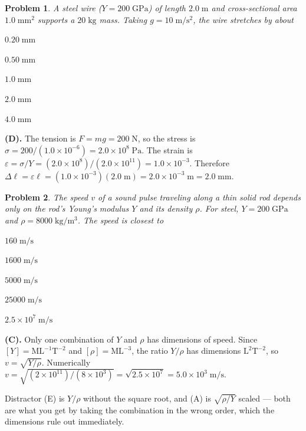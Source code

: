 \documentclass[11pt]{article}
\newcommand{\clearpts}{\addtocounter{tpts}{\value{cpts}} \setcounter{cpts}{0}}
\newcommand{\pts}[1]{\clearpts \setcounter{cpts}{#1}}
\theoremstyle{mystyle}
\newtheorem{pproblem}{Problem}
\begin{document}
\pts{4}
\begin{pproblem}
A steel wire ($Y = 200\;\mathrm{GPa}$) of length $2.0\;\mathrm{m}$ and cross-sectional
area $1.0\;\mathrm{mm}^2$ supports a $20\;\mathrm{kg}$ mass. Taking
$g = 10\;\mathrm{m/s^2}$, the wire stretches by about
\begin{mcchoices}
\item $0.20\;\mathrm{mm}$
\item $0.50\;\mathrm{mm}$
\item $1.0\;\mathrm{mm}$
\item $2.0\;\mathrm{mm}$
\item $4.0\;\mathrm{mm}$
\end{mcchoices}
\end{pproblem}
\begin{solution}
\textbf{(D).} The tension is $F = mg = 200\;\mathrm{N}$, so the stress is
$\sigma = 200/(1.0\times10^{-6}) = 2.0\times 10^{8}\;\mathrm{Pa}$. The strain is
$\varepsilon = \sigma/Y = (2.0\times10^{8})/(2.0\times10^{11}) = 1.0\times 10^{-3}$.
Therefore $\Delta \ell = \varepsilon \ell = (1.0\times10^{-3})(2.0\;\mathrm{m})
= 2.0\times 10^{-3}\;\mathrm{m} = 2.0\;\mathrm{mm}$.
\end{solution}

\pts{4}
\begin{pproblem}
The speed $v$ of a sound pulse traveling along a thin solid rod depends only on the rod's
Young's modulus $Y$ and its density $\rho$. For steel, $Y = 200\;\mathrm{GPa}$ and
$\rho = 8000\;\mathrm{kg/m^3}$. The speed is closest to
\begin{mcchoices}
\item $160\;\mathrm{m/s}$
\item $1600\;\mathrm{m/s}$
\item $5000\;\mathrm{m/s}$
\item $25000\;\mathrm{m/s}$
\item $2.5\times 10^{7}\;\mathrm{m/s}$
\end{mcchoices}
\end{pproblem}
\begin{solution}
\textbf{(C).} Only one combination of $Y$ and $\rho$ has dimensions of speed. Since
$[Y] = \mathrm{M}\mathrm{L}^{-1}\mathrm{T}^{-2}$ and $[\rho] = \mathrm{M}\mathrm{L}^{-3}$, the ratio $Y/\rho$ has dimensions
$\mathrm{L}^2\mathrm{T}^{-2}$, so $v = \sqrt{Y/\rho}$. Numerically
$v = \sqrt{(2\times10^{11})/(8\times10^{3})} = \sqrt{2.5\times10^{7}}
= 5.0\times 10^{3}\;\mathrm{m/s}$.

Distractor (E) is $Y/\rho$ without the square root, and (A) is $\sqrt{\rho/Y}$ scaled ---
both are what you get by taking the combination in the wrong order, which the dimensions
rule out immediately.
\end{solution}
\end{document}
